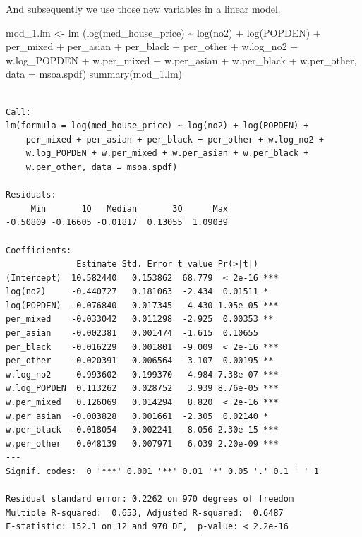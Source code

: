\documentclass[
  letterpaper,
]{scrbook}
\newenvironment{Shaded}{\begin{snugshade}}{\end{snugshade}}
\newcommand{\AttributeTok}[1]{\textcolor[rgb]{0.40,0.45,0.13}{#1}}
\newcommand{\FunctionTok}[1]{\textcolor[rgb]{0.28,0.35,0.67}{#1}}
\newcommand{\NormalTok}[1]{\textcolor[rgb]{0.00,0.23,0.31}{#1}}
\newcommand{\OtherTok}[1]{\textcolor[rgb]{0.00,0.23,0.31}{#1}}
\newcommand{\SpecialCharTok}[1]{\textcolor[rgb]{0.37,0.37,0.37}{#1}}
\begin{document}
And subsequently we use those new variables in a linear model.

\begin{Shaded}
\begin{Highlighting}[]
\NormalTok{mod\_1.lm }\OtherTok{\textless{}{-}} \FunctionTok{lm}\NormalTok{ (}\FunctionTok{log}\NormalTok{(med\_house\_price) }\SpecialCharTok{\textasciitilde{}} \FunctionTok{log}\NormalTok{(no2) }\SpecialCharTok{+} \FunctionTok{log}\NormalTok{(POPDEN) }\SpecialCharTok{+} 
\NormalTok{                  per\_mixed }\SpecialCharTok{+}\NormalTok{ per\_asian }\SpecialCharTok{+}\NormalTok{ per\_black }\SpecialCharTok{+}\NormalTok{ per\_other }\SpecialCharTok{+}
\NormalTok{                  w.log\_no2 }\SpecialCharTok{+}\NormalTok{ w.log\_POPDEN }\SpecialCharTok{+}
\NormalTok{                  w.per\_mixed }\SpecialCharTok{+}\NormalTok{ w.per\_asian }\SpecialCharTok{+}\NormalTok{ w.per\_black }\SpecialCharTok{+}\NormalTok{ w.per\_other,}
                \AttributeTok{data =}\NormalTok{ msoa.spdf)}
\FunctionTok{summary}\NormalTok{(mod\_1.lm)}
\end{Highlighting}
\end{Shaded}

\begin{verbatim}

Call:
lm(formula = log(med_house_price) ~ log(no2) + log(POPDEN) + 
    per_mixed + per_asian + per_black + per_other + w.log_no2 + 
    w.log_POPDEN + w.per_mixed + w.per_asian + w.per_black + 
    w.per_other, data = msoa.spdf)

Residuals:
     Min       1Q   Median       3Q      Max 
-0.50809 -0.16605 -0.01817  0.13055  1.09039 

Coefficients:
              Estimate Std. Error t value Pr(>|t|)    
(Intercept)  10.582440   0.153862  68.779  < 2e-16 ***
log(no2)     -0.440727   0.181063  -2.434  0.01511 *  
log(POPDEN)  -0.076840   0.017345  -4.430 1.05e-05 ***
per_mixed    -0.033042   0.011298  -2.925  0.00353 ** 
per_asian    -0.002381   0.001474  -1.615  0.10655    
per_black    -0.016229   0.001801  -9.009  < 2e-16 ***
per_other    -0.020391   0.006564  -3.107  0.00195 ** 
w.log_no2     0.993602   0.199370   4.984 7.38e-07 ***
w.log_POPDEN  0.113262   0.028752   3.939 8.76e-05 ***
w.per_mixed   0.126069   0.014294   8.820  < 2e-16 ***
w.per_asian  -0.003828   0.001661  -2.305  0.02140 *  
w.per_black  -0.018054   0.002241  -8.056 2.30e-15 ***
w.per_other   0.048139   0.007971   6.039 2.20e-09 ***
---
Signif. codes:  0 '***' 0.001 '**' 0.01 '*' 0.05 '.' 0.1 ' ' 1

Residual standard error: 0.2262 on 970 degrees of freedom
Multiple R-squared:  0.653, Adjusted R-squared:  0.6487 
F-statistic: 152.1 on 12 and 970 DF,  p-value: < 2.2e-16
\end{verbatim}
\end{document}
